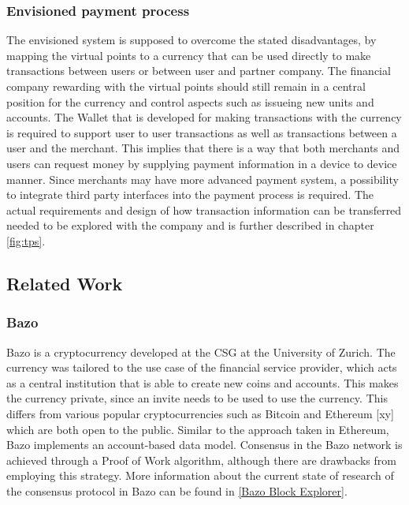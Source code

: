 \documentclass[a4paper]{article}
\begin{document}
\subsubsection{Envisioned payment process}
The envisioned system is supposed to overcome the stated disadvantages, by mapping the virtual points to a currency that can be used directly to make transactions between users or between user and partner company.
The financial company rewarding with the virtual points should still remain in a central position for the currency and control aspects such as issueing new units and accounts.
The Wallet that is developed for making transactions with the currency is required to support user to user transactions as well as transactions between a user and the merchant. This implies that there is a way that both merchants and users can request money by supplying payment information in a device to device manner. Since merchants may have more advanced payment system, a possibility to integrate third party interfaces into the payment process is required. The actual requirements and design of how transaction information can be transferred needed to be explored with the company and is further described in chapter \ref{fig:tps}.


\subsection{Related Work}
\subsubsection{Bazo}
Bazo is a cryptocurrency developed at the CSG at the University of Zurich. The currency was tailored to the use case of the financial service provider, which acts as a central institution that is able to create new coins and accounts. This makes the currency private, since an invite needs to be used to use the currency. This differs from various popular cryptocurrencies such as Bitcoin and Ethereum [xy] which are both open to the public. Similar to the approach taken in Ethereum, Bazo implements an account-based data model. Consensus in the Bazo network is achieved through a Proof of Work algorithm, although there are drawbacks from employing this strategy. More information about the current state of research of the consensus protocol in Bazo can be found in \ref{Bazo Block Explorer}.
\end{document}
